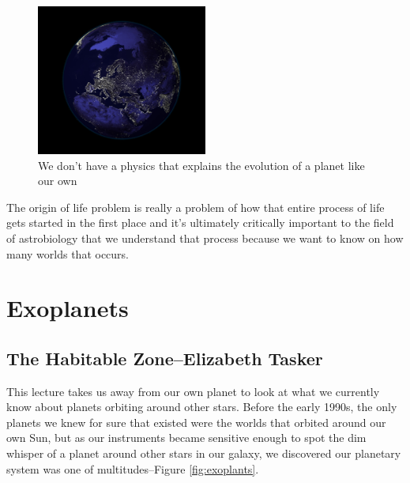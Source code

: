 \documentclass[]{article}
\begin{document}
\begin{figure}[H]
	\begin{center}
		\caption[We don't have a physics that explains the evolution of our planet]{We don't have a physics that explains the evolution of a planet like our own}\label{fig:tellus}
		\includegraphics[width=0.5\textwidth]{Tellus}
	\end{center}
\end{figure}

The origin of life problem is really a problem of how that entire process of life gets started in the first place and it's ultimately critically important to the field of astrobiology that we understand that process because we want to know on how many worlds that occurs.


\section{Exoplanets}

\subsection[The Habitable Zone]{The Habitable Zone--Elizabeth Tasker}


This lecture takes us away
from our own planet
to look at what we currently know about
planets orbiting around other stars.
Before the early 1990s, the only planets
we knew for sure that existed
were the worlds that orbited
around our own Sun,
but as our instruments
became sensitive enough to spot
the dim whisper of a planet
around other stars in our galaxy,
we discovered our planetary system
was one of multitudes--Figure \ref{fig:exoplants}.
\end{document}
